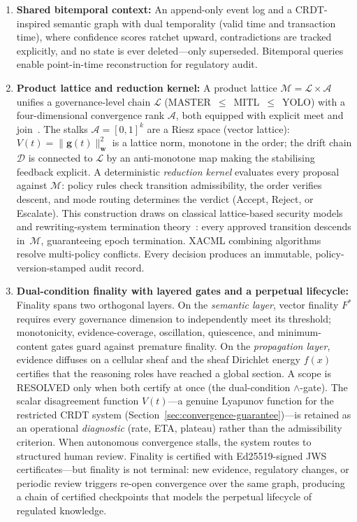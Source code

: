 \documentclass[11pt]{article}
\begin{document}
\begin{enumerate}
  \item \textbf{Shared bitemporal context:} An append-only event log and a CRDT-inspired semantic graph with dual temporality (valid time and transaction time), where confidence scores ratchet upward, contradictions are tracked explicitly, and no state is ever deleted---only superseded. Bitemporal queries enable point-in-time reconstruction for regulatory audit.

  \item \textbf{Product lattice and reduction kernel:} A product lattice $\mathcal{M} = \mathcal{L} \times \mathcal{A}$ unifies a governance-level chain $\mathcal{L}$ (MASTER~$\leq$~MITL~$\leq$~YOLO) with a four-dimensional convergence rank $\mathcal{A}$, both equipped with explicit meet and join~\cite{davey2002}. The stalks $\mathcal{A} = [0,1]^k$ are a Riesz space (vector lattice): $V(t) = \|\mathbf{g}(t)\|^2_\mathbf{w}$ is a lattice norm, monotone in the order; the drift chain $\mathcal{D}$ is connected to $\mathcal{L}$ by an anti-monotone map making the stabilising feedback explicit. A deterministic \emph{reduction kernel} evaluates every proposal against $\mathcal{M}$: policy rules check transition admissibility, the order verifies descent, and mode routing determines the verdict (Accept, Reject, or Escalate). This construction draws on classical lattice-based security models~\cite{denning1976,bell1973} and rewriting-system termination theory~\cite{baader1998}: every approved transition descends in~$\mathcal{M}$, guaranteeing epoch termination. XACML combining algorithms~\cite{xacml2013} resolve multi-policy conflicts. Every decision produces an immutable, policy-version-stamped audit record.

  \item \textbf{Dual-condition finality with layered gates and a perpetual lifecycle:} Finality spans two orthogonal layers. On the \emph{semantic layer}, vector finality $F^*$ requires every governance dimension to independently meet its threshold; monotonicity, evidence-coverage, oscillation, quiescence, and minimum-content gates guard against premature finality. On the \emph{propagation layer}, evidence diffuses on a cellular sheaf and the sheaf Dirichlet energy $f(x)$ certifies that the reasoning roles have reached a global section. A scope is RESOLVED only when both certify at once (the dual-condition $\wedge$-gate). The scalar disagreement function $V(t)$---a genuine Lyapunov function for the restricted CRDT system (Section~\ref{sec:convergence-guarantee})---is retained as an operational \emph{diagnostic} (rate, ETA, plateau) rather than the admissibility criterion. When autonomous convergence stalls, the system routes to structured human review. Finality is certified with Ed25519-signed JWS certificates---but finality is not terminal: new evidence, regulatory changes, or periodic review triggers re-open convergence over the same graph, producing a chain of certified checkpoints that models the perpetual lifecycle of regulated knowledge.


\end{enumerate}
\end{document}

